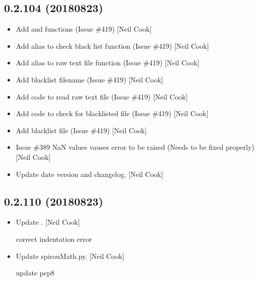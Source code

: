 \documentclass[a4paper,10pt,english]{report}
\begin{document}
\subsection{0.2.104 (2018\sphinxhyphen{}08\sphinxhyphen{}23)}
\label{\detokenize{misc/changelog:id373}}\begin{itemize}
\item {} 
Add  and  functions (Issue \#419) {[}Neil
Cook{]}

\item {} 
Add alias to check black list function (Issue \#419) {[}Neil Cook{]}

\item {} 
Add alias to raw text file function (Issue \#419) {[}Neil Cook{]}

\item {} 
Add blacklist filename (Issue \#419) {[}Neil Cook{]}

\item {} 
Add code to read raw text file (Issue \#419) {[}Neil Cook{]}

\item {} 
Add code to check for blacklisted file (Issue \#419) {[}Neil Cook{]}

\item {} 
Add blacklist file (Issue \#419) {[}Neil Cook{]}

\item {} 
Issue \#389 \sphinxhyphen{} NaN values vauses error to be raised (Needs to be fixed
properly) {[}Neil Cook{]}

\item {} 
Update date version and changelog. {[}Neil Cook{]}

\end{itemize}


\subsection{0.2.110 (2018\sphinxhyphen{}08\sphinxhyphen{}23)}
\label{\detokenize{misc/changelog:id374}}\begin{itemize}
\item {} 
Update . {[}Neil Cook{]}

correct indentation error

\item {} 
Update spirouMath.py. {[}Neil Cook{]}

update pep8

\end{itemize}
\end{document}
